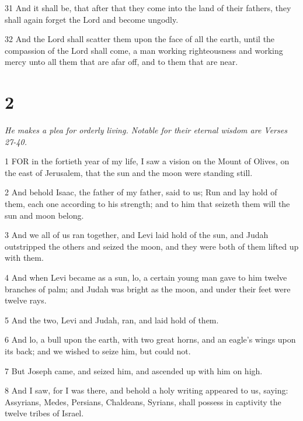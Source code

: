 \par 31 And it shall be, that after that they come into the land of their fathers, they shall again forget the Lord and become ungodly.

\par 32 And the Lord shall scatter them upon the face of all the earth, until the compassion of the Lord shall come, a man working righteousness and working mercy unto all them that are afar off, and to them that are near.



\chapter{2}

\par \textit{He makes a plea for orderly living. Notable for their eternal wisdom are Verses 27-40.}

\par 1 FOR in the fortieth year of my life, I saw a vision on the Mount of Olives, on the east of Jerusalem, that the sun and the moon were standing still.

\par 2 And behold Isaac, the father of my father, said to us; Run and lay hold of them, each one according to his strength; and to him that seizeth them will the sun and moon belong.

\par 3 And we all of us ran together, and Levi laid hold of the sun, and Judah outstripped the others and seized the moon, and they were both of them lifted up with them.

\par 4 And when Levi became as a sun, lo, a certain young man gave to him twelve branches of palm; and Judah was bright as the moon, and under their feet were twelve rays.

\par 5 And the two, Levi and Judah, ran, and laid hold of them.

\par 6 And lo, a bull upon the earth, with two great horns, and an eagle's wings upon its back; and we wished to seize him, but could not.

\par 7 But Joseph came, and seized him, and ascended up with him on high.

\par 8 And I saw, for I was there, and behold a holy writing appeared to us, saying: Assyrians, Medes, Persians, Chaldeans, Syrians, shall possess in captivity the twelve tribes of Israel.

